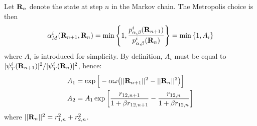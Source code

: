 \documentclass[nofootinbib,reprint,english]{revtex4-1}
\begin{document}
Let \(\vb{R}_n\) denote the state at step \(n\) in the Markov chain. The Metropolis choice is then
\begin{equation*}
\alpha_M^i(\vb{R}_{n+1},\vb{R}_n)=\min\left\lbrace1,\frac{p_{\alpha,\beta}^i(\vb{R}_{n+1})}{p_{\alpha,\beta}^i(\vb{R}_n)}\right\rbrace=\min\left\lbrace1,A_i\right\rbrace
\end{equation*}
where \(A_i\) is introduced for simplicity. By definition, \(A_i\) must be equal to \(|\psi_T^i(\vb{R}_{n+1})|^2/|\psi_T^i(\vb{R}_n)|^2\), hence:
\begin{subequations}\label{eq:VMC_probability_ratios}
\begin{align}
A_1&=\exp\Big[-\alpha\omega\big(||\vb{R}_{n+1}||^2-||\vb{R}_n||^2\big)\Big]\\
A_2&=A_1\exp\bigg[\frac{r_{12,n+1}}{1+\beta r_{12,n+1}}-\frac{r_{12,n}}{1+\beta r_{12,n}}\bigg]
\end{align}
\end{subequations}
where \(||\vb{R}_n||^2=r_{1,n}^2+r_{2,n}^2\).
\end{document}
